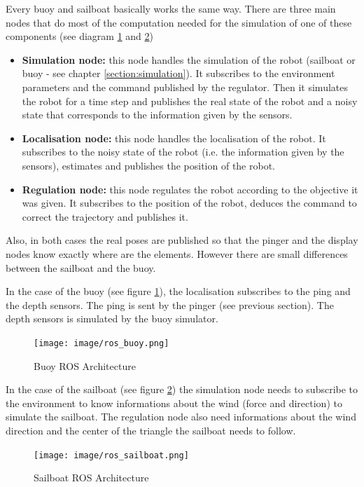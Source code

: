 \documentclass[a4paper]{report}
\begin{document}
Every buoy and sailboat basically works the same way. There are three main nodes that do most of the computation needed for the simulation of one of these components (see diagram \ref{fig:ros_buoy} and \ref{fig:ros_sailboat})
    
    \begin{itemize}
    \item \textbf{Simulation node:} this node handles the simulation of the robot (sailboat or buoy - see chapter \ref{section:simulation}). It subscribes to the environment parameters and the command published by the regulator. Then it simulates the robot for a time step and publishes the real state of the robot and a noisy state that corresponds to the information given by the sensors.
    \item \textbf{Localisation node:} this node handles the localisation of the robot. It subscribes to the noisy state of the robot (i.e. the information given by the sensors), estimates and publishes the position of the robot.
    \item \textbf{Regulation node:} this node regulates the robot according to the objective it was given. It subscribes to the position of the robot, deduces the command to correct the trajectory and publishes it.
    \end{itemize}
  
Also, in both cases the real poses are published so that the pinger and the display nodes know exactly where are the elements. However there are small differences between the sailboat and the buoy.

In the case of the buoy (see figure \ref{fig:ros_buoy}), the localisation subscribes to the ping and the depth sensors. The ping is sent by the pinger (see previous section). The depth sensors is simulated by the buoy simulator.


\begin{figure}[H]
	\centering
	\texttt{[image: image/ros\_buoy.png]}
	\caption{Buoy ROS Architecture}
	\label{fig:ros_buoy}
\end{figure}

In the case of the sailboat (see figure \ref{fig:ros_sailboat}) the simulation node needs to subscribe to the environment to know informations about the wind (force and direction) to simulate the sailboat. The regulation node also need informations about the wind direction and the center of the triangle the sailboat needs to follow.

\begin{figure}[H]
	\centering
	\texttt{[image: image/ros\_sailboat.png]}
	\caption{Sailboat ROS Architecture}
	\label{fig:ros_sailboat}
\end{figure}
\end{document}
